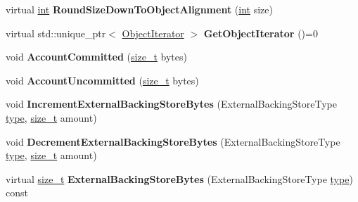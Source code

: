 \begin{DoxyCompactItemize}
\mbox{\label{classv8_1_1internal_1_1Space_a34965d2c93d16a1fd062d17512193153}} 
virtual \mbox{\hyperlink{classint}{int}} {\bfseries Round\+Size\+Down\+To\+Object\+Alignment} (\mbox{\hyperlink{classint}{int}} size)
\item 
\mbox{\label{classv8_1_1internal_1_1Space_a1f517793f261cc6bac46d4c9176ed0c2}} 
virtual std\+::unique\+\_\+ptr$<$ \mbox{\hyperlink{classv8_1_1internal_1_1ObjectIterator}{Object\+Iterator}} $>$ {\bfseries Get\+Object\+Iterator} ()=0
\item 
\mbox{\label{classv8_1_1internal_1_1Space_aac2ce91783e8cac8a2f79ccb16aab8b6}} 
void {\bfseries Account\+Committed} (\mbox{\hyperlink{classsize__t}{size\+\_\+t}} bytes)
\item 
\mbox{\label{classv8_1_1internal_1_1Space_a7ac93e9ded293572d01e1d794aab0826}} 
void {\bfseries Account\+Uncommitted} (\mbox{\hyperlink{classsize__t}{size\+\_\+t}} bytes)
\item 
\mbox{\label{classv8_1_1internal_1_1Space_ae33fcdfec9cb21c744f0b484a741be78}} 
void {\bfseries Increment\+External\+Backing\+Store\+Bytes} (External\+Backing\+Store\+Type \mbox{\hyperlink{classstd_1_1conditional_1_1type}{type}}, \mbox{\hyperlink{classsize__t}{size\+\_\+t}} amount)
\item 
\mbox{\label{classv8_1_1internal_1_1Space_ae3d67ba43ce4c08f70095d96e0ab1df9}} 
void {\bfseries Decrement\+External\+Backing\+Store\+Bytes} (External\+Backing\+Store\+Type \mbox{\hyperlink{classstd_1_1conditional_1_1type}{type}}, \mbox{\hyperlink{classsize__t}{size\+\_\+t}} amount)
\item 
\mbox{\label{classv8_1_1internal_1_1Space_a8958d2acbc696b614ea7f6914863e245}} 
virtual \mbox{\hyperlink{classsize__t}{size\+\_\+t}} {\bfseries External\+Backing\+Store\+Bytes} (External\+Backing\+Store\+Type \mbox{\hyperlink{classstd_1_1conditional_1_1type}{type}}) const
\item 
\mbox{\label{classv8_1_1internal_1_1Space_a82ef7bdcb1823a97efa573cd03f62b93}} 

\end{DoxyCompactItemize}

